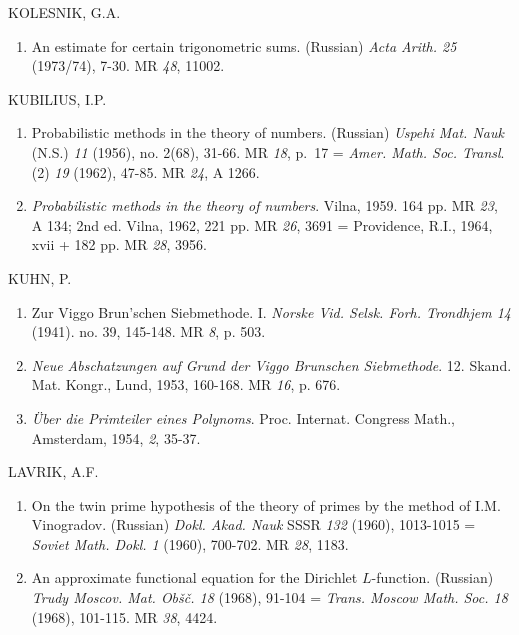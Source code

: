 \begin{thebibliography}{99}
 KOLESNIK, G.A.
\begin{enumerate}
\item An estimate for certain trigonometric sums. (Russian)
  \textit{Acta Arith. 25} (1973/74), 7-30. MR {\em 48}, 11002. 
\end{enumerate}

 KUBILIUS, I.P.
\begin{enumerate}
\item Probabilistic methods in the theory of numbers. (Russian)
  \textit{Uspehi Mat. Nauk} (N.S.) {\em 11} (1956), no. 2(68), 31-66. MR
  {\em 18}, p.~17 = \textit{Amer. Math. Soc. Transl}. (2) {\em 19}
  (1962), 47-85. MR {\em 24}, A 1266. 

\item \textit{Probabilistic methods in the theory of numbers}. Vilna,
  1959. 164 pp. MR {\em 23}, A 134; 2nd ed. Vilna, 1962, 221 pp. MR
  {\em 26}, 3691 = Providence, R.I., 1964, xvii + 182 pp. MR
  {\em 28}, 3956. 
\end{enumerate}

 KUHN, P.
\begin{enumerate}
\item Zur Viggo Brun'schen Siebmethode. I. \textit{Norske
  Vid. Selsk. Forh. Trondhjem 14} (1941). no. 39, 145-148. MR
  {\em 8}, p. 503. 

\item \textit{Neue Abschatzungen auf Grund der Viggo Brunschen
  Siebmethode}. 12. Skand. Mat. Kongr., Lund, 1953, 160-168. MR
  {\em 16}, p. 676. 

\item \textit{\"Uber die Primteiler eines
  Polynoms}. Proc. Internat. Congress Math., Amsterdam,
  1954, {\em 2}, 35-37. 
\end{enumerate}

 LAVRIK, A.F.
\begin{enumerate}
\item On the twin prime hypothesis of the theory of primes by the
  method of I.M. Vinogradov. (Russian) \textit{Dokl. Akad. Nauk} SSSR
  {\em 132} (1960), 1013-1015 = \textit{Soviet Math. Dokl. 1} 
  (1960), 700-702. MR {\em 28}, 1183. 

\item An approximate functional equation for the Dirichlet
  $L$-function. (Russian) \textit{Trudy
  Moscov. Mat. Ob\v{s}\v{c}. 18} (1968), 91-104 = \textit{Trans. Moscow
  Math. Soc. 18} (1968), 101-115. MR {\em 38}, 4424. 
\end{enumerate}


\end{thebibliography}
